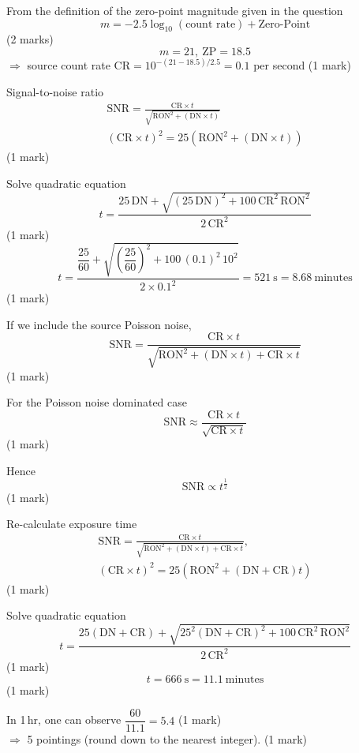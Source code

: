 \begin{description}
From the definition of the zero-point magnitude given in the question
\[ m = -2.5\log_{10}(\text{count rate}) + \text{Zero-Point} \]
\hfill(2 marks)
\[ m = 21,~\mathrm{ZP} = 18.5 \]
$\Rightarrow$ source count rate
$\mathrm{CR} = 10^{-(21-18.5)/2.5} = 0.1$ per second \hfill(1 mark)

Signal-to-noise ratio
\begin{gather*}
\mathrm{SNR} = \frac{\mathrm{CR} \times t}
  {\sqrt{\mathrm{RON}^2 + (\mathrm{DN} \times t)}} \\
(\mathrm{CR} \times t)^2 = 25(\mathrm{RON}^2 + (\mathrm{DN} \times t))
\end{gather*}
\hfill(1 mark)

Solve quadratic equation
\[ t = \frac{25\,\mathrm{DN}
   + \sqrt{(25\,\mathrm{DN})^2 + 100\,\mathrm{CR}^2\,\mathrm{RON}^2}}
   {2\,\mathrm{CR}^2} \]
\hfill(1 mark)
\[ t = \frac{\dfrac{25}{60}
   + \sqrt{\left(\dfrac{25}{60}\right)^2 + 100\,(0.1)^2\,10^2}}
   {2 \times 0.1^2}
   = 521~\mathrm{s} = 8.68~\text{minutes} \]
\hfill(1 mark)

\item[c)]
If we include the source Poisson noise,
\[ \mathrm{SNR} = \frac{\mathrm{CR} \times t}
   {\sqrt{\mathrm{RON}^2 + (\mathrm{DN} \times t) + \mathrm{CR} \times t}} \]
\hfill(1 mark)

For the Poisson noise dominated case
\[ \mathrm{SNR} \approx \frac{\mathrm{CR} \times t}
   {\sqrt{\mathrm{CR} \times t}} \]
\hfill(1 mark)

Hence
\[ \mathrm{SNR} \propto t^{\frac{1}{2}} \]
\hfill(1 mark)

Re-calculate exposure time
\begin{gather*}
\mathrm{SNR} = \frac{\mathrm{CR} \times t}
  {\sqrt{\mathrm{RON}^2 + (\mathrm{DN} \times t) + \mathrm{CR} \times t}}, \\
(\mathrm{CR} \times t)^2
  = 25(\mathrm{RON}^2 + (\mathrm{DN} + \mathrm{CR})t)
\end{gather*}
\hfill(1 mark)

Solve quadratic equation
\[ t = \frac{25(\mathrm{DN} + \mathrm{CR})
   + \sqrt{25^2(\mathrm{DN} + \mathrm{CR})^2
   + 100\,\mathrm{CR}^2\,\mathrm{RON}^2}}{2\,\mathrm{CR}^2} \]
\hfill(1 mark)
\[ t = 666~\mathrm{s} = 11.1~\text{minutes} \]
\hfill(1 mark)

\item[d)]
In 1\,hr, one can observe $\dfrac{60}{11.1} = 5.4$ \hfill(1 mark)\\
$\Rightarrow$ 5 pointings (round down to the nearest integer). \hfill(1 mark)


\end{description}
